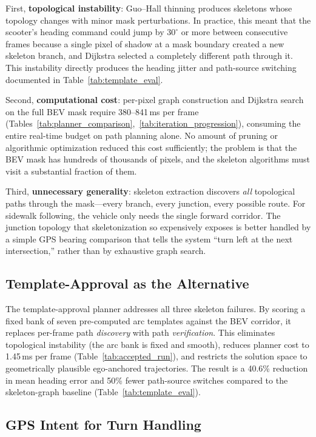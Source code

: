 \documentclass[12pt,letterpaper,oneside]{report}
\begin{document}
First, \textbf{topological instability}: Guo--Hall thinning produces skeletons whose topology changes with minor mask perturbations.  In practice, this meant that the scooter's heading command could jump by $30^\circ$ or more between consecutive frames because a single pixel of shadow at a mask boundary created a new skeleton branch, and Dijkstra selected a completely different path through it.  This instability directly produces the heading jitter and path-source switching documented in Table~\ref{tab:template_eval}.

Second, \textbf{computational cost}: per-pixel graph construction and Dijkstra search on the full BEV mask require 380--841\,ms per frame (Tables~\ref{tab:planner_comparison},~\ref{tab:iteration_progression}), consuming the entire real-time budget on path planning alone.  No amount of pruning or algorithmic optimization reduced this cost sufficiently; the problem is that the BEV mask has hundreds of thousands of pixels, and the skeleton algorithms must visit a substantial fraction of them.

Third, \textbf{unnecessary generality}: skeleton extraction discovers \emph{all} topological paths through the mask---every branch, every junction, every possible route.  For sidewalk following, the vehicle only needs the single forward corridor.  The junction topology that skeletonization so expensively exposes is better handled by a simple GPS bearing comparison that tells the system ``turn left at the next intersection,'' rather than by exhaustive graph search.

\subsection{Template-Approval as the Alternative}

The template-approval planner addresses all three skeleton failures.  By scoring a fixed bank of seven pre-computed arc templates against the BEV corridor, it replaces per-frame path \emph{discovery} with path \emph{verification}.  This eliminates topological instability (the arc bank is fixed and smooth), reduces planner cost to 1.45\,ms per frame (Table~\ref{tab:accepted_run}), and restricts the solution space to geometrically plausible ego-anchored trajectories.  The result is a 40.6\% reduction in mean heading error and 50\% fewer path-source switches compared to the skeleton-graph baseline (Table~\ref{tab:template_eval}).

\subsection{GPS Intent for Turn Handling}
\end{document}
